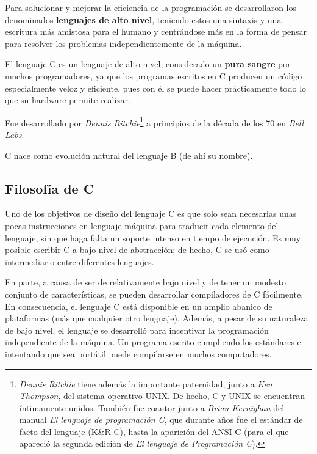 \documentclass[a4paper, 11pt, titlepage]{article}
\begin{document}
    Para solucionar y mejorar la eficiencia de la programación se desarrollaron los 
    denominados \textbf{lenguajes de alto nivel}, teniendo estos una sintaxis y una
    escritura más amistosa para el humano y centrándose más en la forma de pensar 
    para resolver los problemas independientemente de la máquina.

    El lenguaje C es un lenguaje de alto nivel, considerado un \textbf{pura sangre}
    por muchos programadores, ya que los programas escritos en C producen un código 
    especialmente veloz y eficiente, pues con él se puede hacer prácticamente todo 
    lo que su hardware permite realizar.

    Fue desarrollado por \textit{Dennis Ritchie}\footnote{
        \textit{Dennis Ritchie} tiene además la importante paternidad, junto a 
        \textit{Ken Thompson}, del sistema 
        operativo UNIX. De hecho, C y UNIX se encuentran íntimamente unidos.
        También fue coautor junto a \textit{Brian Kernighan} del manual 
        \textit{El lenguaje de programación C}, que durante años fue el estándar 
        de facto del lenguaje (K\&R C), hasta la aparición del ANSI C (para el que 
        apareció la segunda edición de \textit{El lenguaje de Programación C}).
    } a principios de la década de los 70 en \textit{Bell Labs}.

    C nace como evolución natural del lenguaje B (de ahí su nombre).

    \subsection{Filosofía de C}

        Uno de los objetivos de diseño del lenguaje C es que solo sean necesarias 
        unas pocas instrucciones en lenguaje máquina para traducir cada elemento 
        del lenguaje, sin que haga falta un soporte intenso en tiempo de ejecución. 
        Es muy posible escribir C a bajo nivel de abstracción; de hecho, C se usó 
        como intermediario entre diferentes lenguajes.

        En parte, a causa de ser de relativamente bajo nivel y de tener un modesto 
        conjunto de características, se pueden desarrollar compiladores de C fácilmente. 
        En consecuencia, el lenguaje C está disponible en un amplio abanico de 
        plataformas (más que cualquier otro lenguaje). Además, a pesar de su naturaleza 
        de bajo nivel, el lenguaje se desarrolló para incentivar la programación 
        independiente de la máquina. Un programa escrito cumpliendo los estándares e 
        intentando que sea portátil puede compilarse en muchos computadores.
\end{document}
